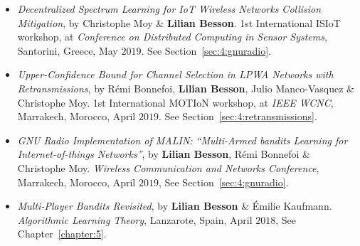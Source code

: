 \begin{itemize}
\item
    \emph{Decentralized Spectrum Learning for IoT Wireless Networks Collision Mitigation},
    by Christophe Moy \& \textbf{Lilian Besson}.
    1st International ISIoT workshop,
    at \emph{Conference on Distributed Computing in Sensor Systems},
    Santorini, Greece, May $2019$.
    See Section~\ref{sec:4:gnuradio}.
    \cite{MoyBesson2019}


\item
    \emph{Upper-Confidence Bound for Channel Selection in LPWA Networks with Retransmissions},
    by Rémi Bonnefoi, \textbf{Lilian Besson}, Julio Manco-Vasquez \& Christophe Moy.
    1st International MOTIoN workshop,
    at \emph{IEEE WCNC}, Marrakech, Morocco, April $2019$.
    See Section~\ref{sec:4:retransmissions}.
    \cite{Bonnefoi2019WCNC}

\item
    \emph{GNU Radio Implementation of MALIN: ``Multi-Armed bandits Learning for Internet-of-things Networks''},
    by \textbf{Lilian Besson}, Rémi Bonnefoi \& Christophe Moy.
    \emph{Wireless Communication and Networks Conference},
    Marrakech, Morocco, April $2019$,
    See Section~\ref{sec:4:gnuradio}.
    \cite{Besson2019WCNC}

\item
    \emph{Multi-Player Bandits Revisited},
    by \textbf{Lilian Besson} \& Émilie Kaufmann.
    \emph{Algorithmic Learning Theory},
    Lanzarote, Spain, April $2018$,
    See Chapter~\ref{chapter:5}.
    \cite{Besson2018ALT}


\end{itemize}
